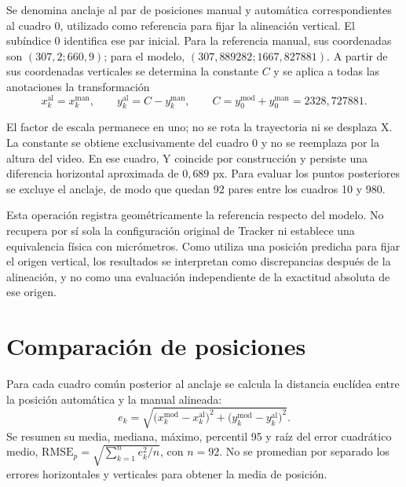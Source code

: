 Se denomina anclaje al par de posiciones manual y automática correspondientes al cuadro 0, utilizado como referencia para fijar la alineación vertical. El subíndice $0$ identifica ese par inicial. Para la referencia manual, sus coordenadas son $(307{,}2;660{,}9)$; para el modelo, $(307{,}889282;1667{,}827881)$. A partir de sus coordenadas verticales se determina la constante $C$ y se aplica a todas las anotaciones la transformación
\begin{equation}
 x^{\mathrm{al}}_k=x^{\mathrm{man}}_k,
 \qquad
 y^{\mathrm{al}}_k=C-y^{\mathrm{man}}_k,
 \qquad
 C=y^{\mathrm{mod}}_0+y^{\mathrm{man}}_0
   =2328{,}727881.
 \label{eq:alineacion-tracker}
\end{equation}

El factor de escala permanece en uno; no se rota la trayectoria ni se desplaza X. La constante se obtiene exclusivamente del cuadro 0 y no se reemplaza por la altura del video. En ese cuadro, Y coincide por construcción y persiste una diferencia horizontal aproximada de $0{,}689$ px. Para evaluar los puntos posteriores se excluye el anclaje, de modo que quedan 92 pares entre los cuadros 10 y 980.

Esta operación registra geométricamente la referencia respecto del modelo. No recupera por sí sola la configuración original de Tracker ni establece una equivalencia física con micrómetros. Como utiliza una posición predicha para fijar el origen vertical, los resultados se interpretan como discrepancias después de la alineación, y no como una evaluación independiente de la exactitud absoluta de ese origen.

\section{Comparación de posiciones}

Para cada cuadro común posterior al anclaje se calcula la distancia euclídea entre la posición automática y la manual alineada:
\begin{equation}
 e_k=\sqrt{\bigl(x^{\mathrm{mod}}_k-x^{\mathrm{al}}_k\bigr)^2+
                  \bigl(y^{\mathrm{mod}}_k-y^{\mathrm{al}}_k\bigr)^2}.
 \label{eq:error-posicion-experimental}
\end{equation}
Se resumen su media, mediana, máximo, percentil 95 y raíz del error cuadrático medio, $\mathrm{RMSE}_{p}=\sqrt{\sum_{k=1}^{n}e_k^2/n}$, con $n=92$. No se promedian por separado los errores horizontales y verticales para obtener la media de posición.

